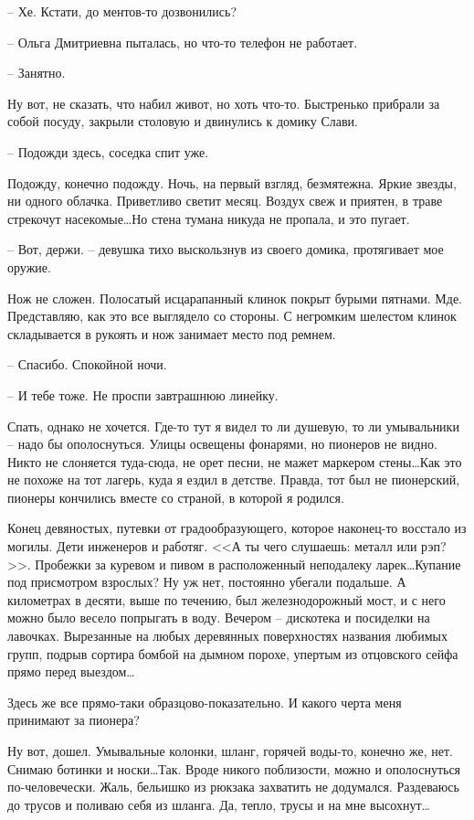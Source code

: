\documentclass[a4paper]{book}
\begin{document}
-- Хе. Кстати, до ментов-то дозвонились?

-- Ольга Дмитриевна пыталась, но что-то телефон не работает.

-- Занятно. 

Ну вот, не сказать, что набил живот, но хоть что-то. Быстренько прибрали за собой посуду, закрыли столовую и двинулись к домику Слави. 


-- Подожди здесь, соседка спит уже.

Подожду, конечно подожду. Ночь, на первый взгляд, безмятежна. Яркие звезды, ни одного облачка.  Приветливо светит месяц. Воздух свеж и приятен, в траве стрекочут насекомые\ldots Но стена тумана никуда не пропала, и это пугает. 


-- Вот, держи. -- девушка тихо выскользнув из своего домика, протягивает мое оружие. 

Нож не сложен. Полосатый исцарапанный клинок покрыт бурыми пятнами. Мде. Представляю, как это все выглядело со стороны. С негромким шелестом клинок складывается в рукоять и нож занимает место под ремнем.


-- Спасибо. Спокойной ночи.

-- И тебе тоже. Не проспи завтрашнюю линейку.

Спать, однако не хочется. Где-то тут я видел то ли душевую, то ли умывальники -- надо бы ополоснуться. Улицы освещены фонарями, но пионеров не видно. Никто не слоняется туда-сюда, не  орет песни, не мажет маркером стены\ldots Как это не похоже на тот лагерь, куда я ездил в детстве. Правда, тот был не пионерский, пионеры кончились вместе со страной, в которой я родился. 

Конец девяностых, путевки от градообразующего, которое наконец-то восстало из могилы. Дети инженеров и работяг. <<А ты чего слушаешь: металл или рэп?>>. Пробежки за куревом и пивом в расположенный неподалеку ларек\ldots Купание под присмотром взрослых? Ну уж нет, постоянно убегали подальше. А километрах в десяти, выше по течению, был железнодорожный мост, и с него можно было весело попрыгать в воду. Вечером -- дискотека и посиделки на лавочках. Вырезанные на любых деревянных поверхностях названия любимых групп, подрыв сортира бомбой на дымном порохе, упертым из отцовского сейфа прямо перед выездом\ldots 

Здесь же все прямо-таки образцово-показательно. И какого черта меня принимают за пионера? 

Ну вот, дошел. Умывальные колонки, шланг, горячей воды-то, конечно же, нет. Снимаю ботинки и носки\ldots Так. Вроде никого поблизости, можно и ополоснуться по-человечески. Жаль, бельишко из рюкзака захватить не додумался. Раздеваюсь до трусов и поливаю себя из шланга. Да, тепло, трусы и на мне высохнут\ldots
\end{document}
